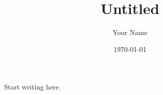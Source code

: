 \documentclass[11pt]{article}
\title{Untitled}
\author{Your Name}
\date{\today}
\begin{document}
\maketitle

Start writing here.
\end{document}
